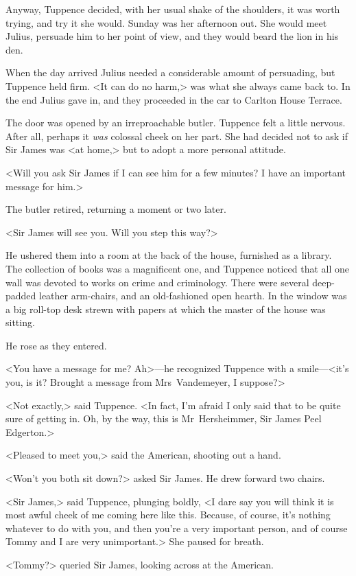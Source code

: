 Anyway, Tuppence decided, with her usual shake of the shoulders, it was worth trying, and try it she would. Sunday was her afternoon out. She would meet Julius, persuade him to her point of view, and they would beard the lion in his den.

When the day arrived Julius needed a considerable amount of persuading, but Tuppence held firm. <It can do no harm,> was what she always came back to. In the end Julius gave in, and they proceeded in the car to Carlton House Terrace.

The door was opened by an irreproachable butler. Tuppence felt a little nervous. After all, perhaps it \emph{was} colossal cheek on her part. She had decided not to ask if Sir James was <at home,> but to adopt a more personal attitude.

<Will you ask Sir James if I can see him for a few minutes? I have an important message for him.>

The butler retired, returning a moment or two later.

<Sir James will see you. Will you step this way?>

He ushered them into a room at the back of the house, furnished as a library. The collection of books was a magnificent one, and Tuppence noticed that all one wall was devoted to works on crime and criminology. There were several deep-padded leather arm-chairs, and an old-fashioned open hearth. In the window was a big roll-top desk strewn with papers at which the master of the house was sitting.

He rose as they entered.

<You have a message for me? Ah>—he recognized Tuppence with a smile—<it's you, is it? Brought a message from Mrs~Vandemeyer, I suppose?>

<Not exactly,> said Tuppence. <In fact, I'm afraid I only said that to be quite sure of getting in. Oh, by the way, this is Mr~Hersheimmer, Sir James Peel Edgerton.>

<Pleased to meet you,> said the American, shooting out a hand.

<Won't you both sit down?> asked Sir James. He drew forward two chairs.

<Sir James,> said Tuppence, plunging boldly, <I dare say you will think it is most awful cheek of me coming here like this. Because, of course, it's nothing whatever to do with you, and then you're a very important person, and of course Tommy and I are very unimportant.> She paused for breath.

<Tommy?> queried Sir James, looking across at the American.

